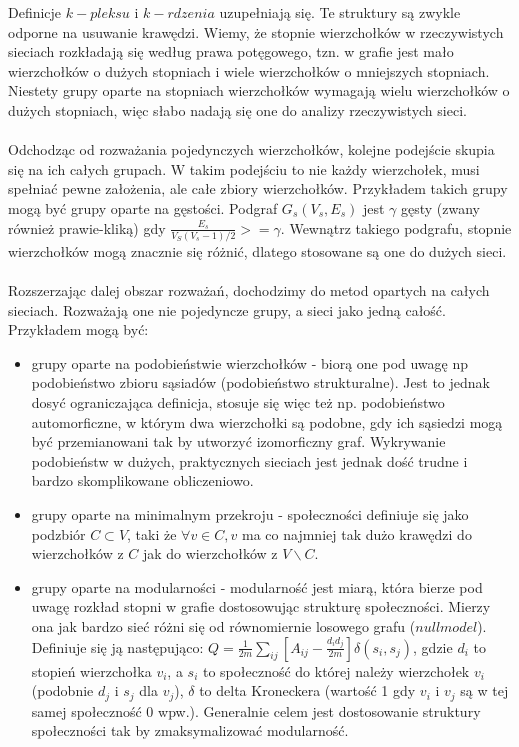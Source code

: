 \documentclass{article}
\begin{document}
Definicje $k-pleksu$ i $k - rdzenia$ uzupełniają się. Te struktury są zwykle odporne na usuwanie krawędzi. Wiemy, że stopnie wierzchołków w rzeczywistych sieciach rozkładają się według prawa potęgowego, tzn. w grafie jest mało wierzchołków o dużych stopniach i wiele wierzchołków o mniejszych stopniach. Niestety grupy oparte na stopniach wierzchołków wymagają wielu wierzchołków o dużych stopniach, więc słabo nadają się one do analizy rzeczywistych sieci.
\\ \\
Odchodząc od rozważania pojedynczych wierzchołków, kolejne podejście skupia się na ich całych grupach. W takim podejściu to nie każdy wierzchołek, musi spełniać pewne założenia, ale całe zbiory wierzchołków. Przykładem takich grupy mogą być grupy oparte na gęstości. Podgraf $G_s(V_s,E_s)$ jest $\gamma$ gęsty (zwany również prawie-kliką) gdy $\frac{E_s}{V_S(V_s-1)/2} >= \gamma$. Wewnątrz takiego podgrafu, stopnie wierzchołków mogą znacznie się różnić, dlatego stosowane są one do dużych sieci.
\\\\
Rozszerzając dalej obszar rozważań, dochodzimy do metod opartych na całych sieciach. Rozważają one nie pojedyncze grupy, a sieci jako jedną całość. Przykładem mogą być: 
\begin{itemize}
\item grupy oparte na podobieństwie wierzchołków - biorą one pod uwagę np podobieństwo zbioru sąsiadów (podobieństwo strukturalne). Jest to jednak dosyć ograniczająca definicja, stosuje się więc też np. podobieństwo automorficzne, w którym dwa wierzchołki są podobne, gdy ich sąsiedzi mogą być przemianowani tak by utworzyć izomorficzny graf. Wykrywanie podobieństw w dużych, praktycznych sieciach jest jednak dość trudne i bardzo skomplikowane obliczeniowo.
\item grupy oparte na minimalnym przekroju - społeczności definiuje się jako podzbiór $C \subset V$, taki że $\forall v \in C, v$ ma co najmniej tak dużo krawędzi do wierzchołków z $C$ jak do wierzchołków z $V \backslash C$.
\item grupy oparte na modularności - modularność jest miarą, która bierze pod uwagę rozkład stopni w grafie dostosowując strukturę społeczności. Mierzy ona jak bardzo sieć różni się od równomiernie losowego grafu ($null model$). Definiuje się ją następująco: $Q= \frac{1}{2m} \sum\limits_{ij} [A_{ij} - \frac{d_i d_j}{2m}]\delta(s_i,s_j)$, gdzie $d_i$ to stopień wierzchołka $v_i$, a $s_i$ to społeczność do której należy wierzchołek $v_i$ (podobnie $d_j$ i $s_j$ dla $v_j$), $\delta$ to delta Kroneckera (wartość 1 gdy $v_i$ i $v_j$ są w tej samej społeczność 0 wpw.). Generalnie celem jest dostosowanie struktury społeczności tak by zmaksymalizować modularność.
\end{itemize}
\end{document}
